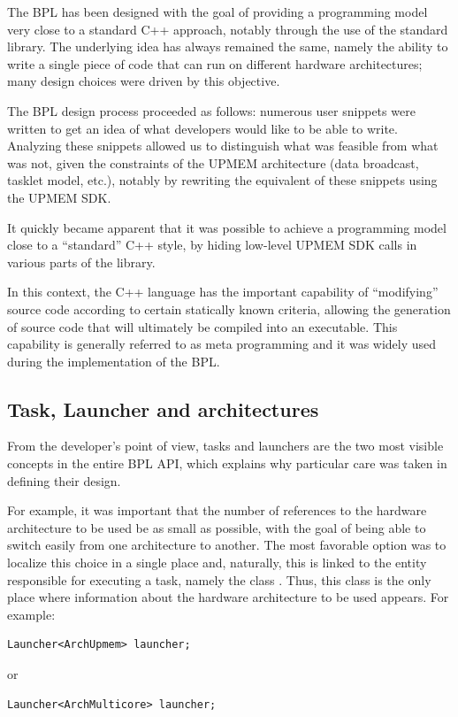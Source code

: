 The BPL has been designed with the goal of providing a programming model very close to a standard C++ approach,  notably through the use of the standard library. The underlying idea has always remained the same, namely the ability to write a single piece of code  that can run on different hardware architectures; many design choices were driven by this objective.

The BPL design process proceeded as follows: numerous user snippets were written to get an idea of what developers would like to be able to write. Analyzing these snippets allowed us to distinguish what was feasible from what was not, given the constraints of the UPMEM architecture (data broadcast, tasklet model, etc.), notably by rewriting the equivalent of these snippets using the UPMEM SDK.

It quickly became apparent that it was possible to achieve a programming model close to a “standard” C++ style, by hiding low-level UPMEM SDK calls in various parts of the library.

In this context, the C++ language has the important capability of “modifying” source code according to certain statically known criteria, allowing the generation of source code that will ultimately be compiled into an executable. 
This capability is generally referred to as meta programming and it was widely used during the implementation of the BPL.

\subsection{Task, Launcher and architectures}

From the developer’s point of view, tasks and launchers are the two most visible concepts in the entire BPL API, which explains why particular care was taken in defining their design.

For example, it was important that the number of references to the hardware architecture to be used be as small as possible,  with the goal of being able to switch easily from one architecture to another. The most favorable option was to localize  this choice in a single place and, naturally, this is linked to the entity responsible for executing a task,  namely the class . Thus, this class is the only place where information  about the hardware architecture to be used appears. For example:

\begin{verbatim}
Launcher<ArchUpmem> launcher;
\end{verbatim}
or
\begin{verbatim}
Launcher<ArchMulticore> launcher;
\end{verbatim}

